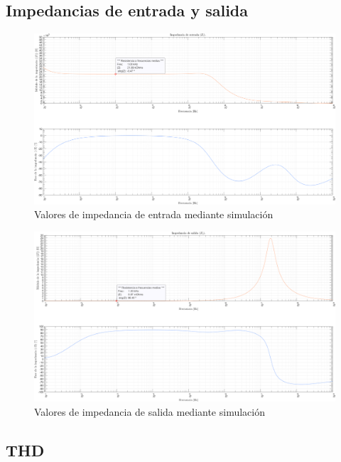\subsection{Impedancias de entrada y salida}

\begin{figure}[H]
    \centering
    \includegraphics[scale=0.4]{./img/simulaciones/Impedance/amplifier_Zi.png}
    \caption{Valores de impedancia de entrada mediante simulación}
    \label{fig:amplifier_Zi_sim}
\end{figure}

\begin{figure}[H]
    \centering
    \includegraphics[scale=0.4]{./img/simulaciones/Impedance/amplifier_Zo.png}
    \caption{Valores de impedancia de salida mediante simulación}
    \label{fig:amplifier_Zo_sim}
\end{figure}

\subsection{THD}

